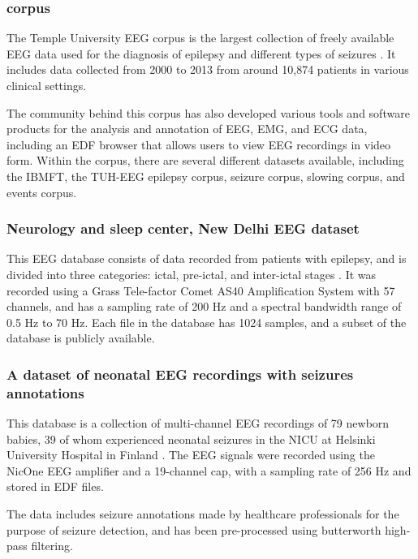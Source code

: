 \subsubsection{ corpus}
The Temple University \gls{EEG} corpus is the largest collection of freely available \gls{EEG} data used for the diagnosis of epilepsy and different types of seizures \cite{obeid_temple_2016}. It includes data collected from 2000 to 2013 from around 10,874 patients in various clinical settings. 

The community behind this corpus has also developed various tools and software products for the analysis and annotation of \gls{EEG}, \gls{EMG}, and \gls{ECG} data, including an \gls{EDF} browser that allows users to view \gls{EEG} recordings in video form. Within the corpus, there are several different datasets available, including the \gls{IBMFT}, the \gls{TUH-EEG} epilepsy corpus, seizure corpus, slowing corpus, and events corpus.

\subsubsection{Neurology and sleep center, New Delhi EEG dataset}
This \gls{EEG} database consists of data recorded from patients with epilepsy, and is divided into three categories: ictal, pre-ictal, and inter-ictal stages \cite{swami_eeg_2016}. It was recorded using a Grass Tele-factor Comet AS40 Amplification System with 57 channels, and has a sampling rate of 200 Hz and a spectral bandwidth range of 0.5 Hz to 70 Hz. Each file in the database has 1024 samples, and a subset of the database is publicly available.

\subsubsection{A dataset of neonatal EEG recordings with seizures annotations}
This database is a collection of multi-channel \gls{EEG} recordings of 79 newborn babies, 39 of whom experienced neonatal seizures in the \gls{NICU} at Helsinki University Hospital in Finland \cite{stevenson_dataset_2018}. The \gls{EEG} signals were recorded using the NicOne \gls{EEG} amplifier and a 19-channel cap, with a sampling rate of 256 Hz and stored in \gls{EDF} files. 

The data includes seizure annotations made by healthcare professionals for the purpose of seizure detection, and has been pre-processed using butterworth high-pass filtering.

